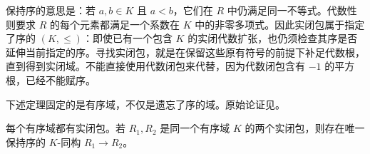 保持序的意思是：若 \(a,b\in K\) 且 \(a<b\)，它们在 \(R\) 中仍满足同一不等式。代数性则要求 \(R\) 的每个元素都满足一个系数在 \(K\) 中的非零多项式。因此实闭包属于指定了序的 \((K,\leq)\)：即使已有一个包含 \(K\) 的实闭代数扩张，也仍须检查其序是否延伸当前指定的序。寻找实闭包，就是在保留这些原有符号的前提下补足代数根，直到得到实闭域。不能直接使用代数闭包来代替，因为代数闭包含有 \(-1\) 的平方根，已经不能赋序。

\ProseParagraphBreak
下述定理固定的是有序域，不仅是遗忘了序的域。原始论证见\cite[Satz 8]{ArtinSchreier1927RealFields}。
\begin{theorem}[实闭包]\label{b1:thm:real-closure-existence}
	每个有序域都有实闭包。若 \(R_1,R_2\) 是同一个有序域 \(K\) 的两个实闭包，则存在唯一保持序的 \(K\)-同构 \(R_1\rightarrow R_2\)。
\end{theorem}

